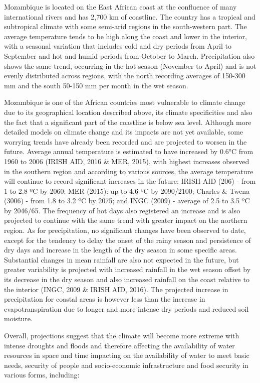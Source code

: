 \documentclass[
]{book}
\begin{document}
Mozambique is located on the East African coast at the confluence of many international rivers and has 2,700 km of coastline. The country has a tropical and subtropical climate with some semi-arid regions in the south-western part. The average temperature tends to be high along the coast and lower in the interior, with a seasonal variation that includes cold and dry periods from April to September and hot and humid periods from October to March. Precipitation also shows the same trend, occurring in the hot season (November to April) and is not evenly distributed across regions, with the north recording averages of 150-300 mm and the south 50-150 mm per month in the wet season.

Mozambique is one of the African countries most vulnerable to climate change due to its geographical location described above, its climate specificities and also the fact that a significant part of the coastline is below sea level. Although more detailed models on climate change and its impacts are not yet available, some worrying trends have already been recorded and are projected to worsen in the future. Average annual temperature is estimated to have increased by 0.6°C from 1960 to 2006 (IRISH AID, 2016 \& MER, 2015), with highest increases observed in the southern region and according to various sources, the average temperature will continue to record significant increases in the future: IRISH AID (206) - from 1 to 2.8 ºC by 2060; MER (2015): up to 4.6 ºC by 2090/2100; Charles \& Twena (3006) - from 1.8 to 3.2 ºC by 2075; and INGC (2009) - average of 2.5 to 3.5 ºC by 2046/65. The frequency of hot days also registered an increase and is also projected to continue with the same trend with greater impact on the northern region. As for precipitation, no significant changes have been observed to date, except for the tendency to delay the onset of the rainy season and persistence of dry days and increase in the length of the dry season in some specific areas. Substantial changes in mean rainfall are also not expected in the future, but greater variability is projected with increased rainfall in the wet season offset by its decrease in the dry season and also increased rainfall on the coast relative to the interior (INGC, 2009 \& IRISH AID, 2016). The projected increase in precipitation for coastal areas is however less than the increase in evapotranspiration due to longer and more intense dry periods and reduced soil moisture.

Overall, projections suggest that the climate will become more extreme with intense droughts and floods and therefore affecting the availability of water resources in space and time impacting on the availability of water to meet basic needs, security of people and socio-economic infrastructure and food security in various forms, including:
\end{document}

